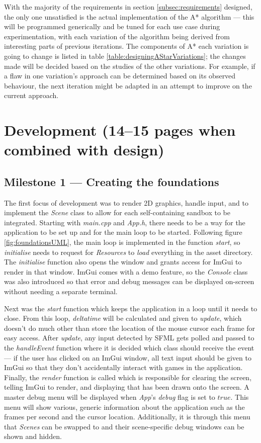 \documentclass[11pt, a4paper]{report}
\begin{document}
With the majority of the requirements in section \ref{subsec:requirements} designed, the only one unsatisfied is the actual implementation of the A* algorithm --- this will be programmed generically and be tuned for each use case during experimentation, with each variation of the algorithm being derived from interesting parts of previous iterations. The components of A* each variation is going to change is listed in table \ref{table:designingAStarVariations}; the changes made will be decided based on the studies of the other variations. For example, if a flaw in one variation's approach can be determined based on its observed behaviour, the next iteration might be adapted in an attempt to improve on the current approach.

\section{Development (14--15 pages when combined with design)}
\label{sec:development}

\subsection[Creating the foundations]{Milestone 1 --- Creating the foundations}
\label{subsec:creatingTheFoundations}

The first focus of development was to render 2D graphics, handle input, and to implement the \emph{Scene} class to allow for each self-containing sandbox to be integrated. Starting with \emph{main.cpp} and \emph{App.h}, there needs to be a way for the application to be set up and for the main loop to be started. Following figure \ref{fig:foundationsUML}, the main loop is implemented in the function \emph{start}, so \emph{initialise} needs to request for \emph{Resources} to \emph{load} everything in the asset directory. The \emph{initialise} function also opens the window and grants access for ImGui to render in that window. ImGui comes with a demo feature, so the \emph{Console} class was also introduced so that error and debug messages can be displayed on-screen without needing a separate terminal.

Next was the \emph{start} function which keeps the application in a loop until it needs to close. From this loop, \emph{deltatime} will be calculated and given to \emph{update}, which doesn't do much other than store the location of the mouse cursor each frame for easy access. After \emph{update}, any input detected by SFML gets polled and passed to the \emph{handleEvent} function where it is decided which class should receive the event --- if the user has clicked on an ImGui window, all text input should be given to ImGui so that they don't accidentally interact with games in the application. Finally, the \emph{render} function is called which is responsible for clearing the screen, telling ImGui to render, and displaying that has been drawn onto the screen. A master debug menu will be displayed when \emph{App}'s \emph{debug} flag is set to $true$. This menu will show various, generic information about the application such as the frames per second and the cursor location. Additionally, it is through this menu that \emph{Scenes} can be swapped to and their scene-specific debug windows can be shown and hidden.
\end{document}
